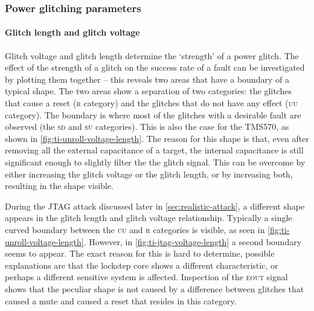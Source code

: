 \documentclass[10pt]{article}
\newcommand{\TI}{TMS570\xspace}
\newcommand{\UU}{\textsc{uu}\xspace}
\newcommand{\SU}{\textsc{su}\xspace}
\newcommand{\SD}{\textsc{sd}\xspace}
\newcommand{\R}{\textsc{r}\xspace}
\newcommand{\errorpin}{\textsc{eout}\xspace}
\begin{document}
    \subsubsection{Power glitching parameters}

      \paragraph*{Glitch length and glitch voltage}%
        Glitch voltage and glitch length determine the `strength' of a power glitch. The effect of the strength of a glitch on the success rate of a fault can be investigated by plotting them together -- this reveals two areas that have a boundary of a typical \cite{carpi_glitch_2013} shape. The two areas show a separation of two categories: the glitches that cause a reset (\R category) and the glitches that do not have any effect (\UU category). The boundary is where most of the glitches with a desirable fault are observed (the \SD and \SU categories). This is also the case for the \TI, as shown in \autoref{fig:ti-unroll-voltage-length}. The reason for this shape is that, even after removing all the external capacitance of a target, the internal capacitance is still significant enough to slightly filter the the glitch signal. This can be overcome by either increasing the glitch voltage or the glitch length, or by increasing both, resulting in the shape visible.

        During the JTAG attack discussed later in \autoref{sec:realistic-attack}, a different shape appears in the glitch length and glitch voltage relationship. Typically a single curved boundary between the \UU and \R categories is visible, as seen in \autoref{fig:ti-unroll-voltage-length}. However, in \autoref{fig:ti-jtag-voltage-length} a second boundary seems to appear. The exact reason for this is hard to determine, possible explanations are that the lockstep core shows a different characteristic, or perhaps a different sensitive system is affected. Inspection of the \errorpin signal shows that the peculiar shape is not caused by a difference between glitches that caused a mute and caused a reset that resides in this category.
\end{document}

